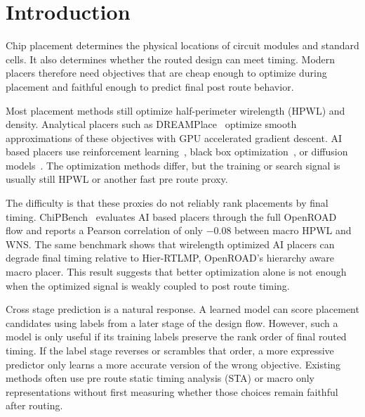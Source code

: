 \documentclass[sigconf,anonymous,review,9pt]{acmart}
\begin{document}

\maketitle

\section{Introduction}
\label{sec:intro}

Chip placement determines the physical locations of circuit modules and
standard cells. It also determines whether the routed design can meet
timing. Modern placers therefore need objectives that are cheap enough
to optimize during placement and faithful enough to predict final
post route behavior.

Most placement methods still optimize half-perimeter wirelength
(HPWL) and density. Analytical placers such as
DREAMPlace~\cite{lin2019dreamplace} optimize smooth approximations of
these objectives with GPU accelerated gradient descent. AI based
placers use reinforcement learning~\cite{mirhoseini2021graph,
lai2022maskplace, lai2023chipformer}, black box
optimization~\cite{shi2023wire}, or diffusion
models~\cite{lee2024chip}. The optimization methods differ, but the
training or search signal is usually still HPWL or another fast
pre route proxy.

The difficulty is that these proxies do not reliably rank placements by
final timing. ChiPBench~\cite{chipbench2025} evaluates AI based placers
through the full OpenROAD~\cite{ajayi2019openroad} flow and reports a
Pearson correlation of only $-0.08$ between macro HPWL and WNS. The same
benchmark shows that wirelength optimized AI placers can degrade final
timing relative to Hier-RTLMP, OpenROAD's hierarchy aware macro placer.
This result suggests that better optimization alone is not enough when
the optimized signal is weakly coupled to post route timing.

Cross stage prediction is a natural response. A learned model can score
placement candidates using labels from a later stage of the design flow.
However, such a model is only useful if its training labels preserve the
rank order of final routed timing. If the label stage reverses or
scrambles that order, a more expressive predictor only learns a more
accurate version of the wrong objective. Existing methods often use
pre route static timing analysis (STA) or macro only representations
without first measuring whether those choices remain faithful after
routing.
\end{document}
